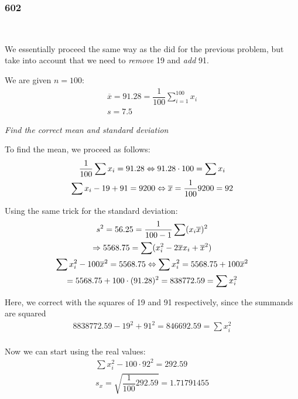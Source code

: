 \subsubsection{602}\hfill\\\par
\noindent We essentially proceed the same way as the did for the previous problem, but take into account that we need to \textit{remove} 19 and \textit{add} 91.
\par\bigskip
\noindent We are given $n = 100$:
\begin{equation*}
  \begin{gathered}
    \overline{x} = 91.28 = \dfrac{1}{100}\sum_{i=1}^{100}x_i\\
    s = 7.5
  \end{gathered}
\end{equation*}
\par\bigskip
\noindent\textit{Find the correct mean and standard deviation}
\par\bigskip
\noindent To find the mean, we proceed as follows:
\begin{equation*}
  \begin{gathered}
    \dfrac{1}{100}\sum x_i = 91.28\Leftrightarrow 91.28\cdot100 = \sum x_i\\
    \sum x_i-19+91 = 9200\Leftrightarrow \overline{x} =\dfrac{1}{100}9200 = 92
  \end{gathered}
\end{equation*}
\par\bigskip
\noindent Using the same trick for the standard deviation:
\begin{equation*}
  \begin{gathered}
    s^2 = 56.25 = \dfrac{1}{100-1}\sum (x_i\overline{x})^2\\
    \Rightarrow 5568.75 = \sum (x_i^2-2\overline{x}x_i+\overline{x}^2)\\
    \sum x_i^2-100\overline{x}^2 = 5568.75\Leftrightarrow \sum x_i^2 = 5568.75+100\overline{x}^2\\
    = 5568.75+100\cdot(91.28)^2 = 838772.59 = \sum x_i^2\\
  \end{gathered}
\end{equation*}\par
\noindent Here, we correct with the squares of 19 and 91 respectively, since the summands are squared
\begin{equation*}
  \begin{gathered}
    8838772.59-19^2+91^2 = 846692.59 =\sum x_i^2\\
  \end{gathered}
\end{equation*}\par
\noindent Now we can start using the real values:
\begin{equation*}
  \begin{gathered}
    \sum x_i^2 -100\cdot 92^2 = 292.59\\
    s_x = \sqrt{\dfrac{1}{100}292.59} = 1.71791455
  \end{gathered}
\end{equation*}
\par\bigskip
